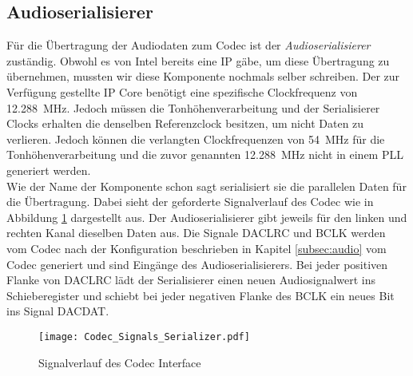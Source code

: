 \newpage
\subsection{Audioserialisierer}\label{subsec:Audio_Serializer}

Für die Übertragung der Audiodaten zum Codec ist der \textit{Audioserialisierer} zuständig. Obwohl es von Intel bereits eine IP gäbe, um diese Übertragung zu übernehmen, mussten wir diese Komponente nochmals selber schreiben. Der zur Verfügung gestellte IP Core benötigt eine spezifische Clockfrequenz von \SI{12.288}{MHz}. Jedoch müssen die Tonhöhenverarbeitung und der Serialisierer Clocks erhalten die denselben Referenzclock besitzen, um nicht Daten zu verlieren. Jedoch können die verlangten Clockfrequenzen von \SI{54}{MHz} für die Tonhöhenverarbeitung und die zuvor genannten \SI{12.288}{MHz} nicht in einem PLL generiert werden. \\
Wie der Name der Komponente schon sagt serialisiert sie die parallelen Daten für die Übertragung. Dabei sieht der geforderte Signalverlauf des Codec wie in Abbildung \ref{img:Codec_Signals} dargestellt aus. Der Audioserialisierer gibt jeweils für den linken und rechten Kanal dieselben Daten aus. Die Signale DACLRC und BCLK werden vom Codec nach der Konfiguration beschrieben in Kapitel \ref{subsec:audio} vom Codec generiert und sind Eingänge des Audioserialisierers. Bei jeder positiven Flanke von DACLRC lädt der Serialisierer einen neuen Audiosignalwert ins Schieberegister und schiebt bei jeder negativen Flanke des BCLK ein neues Bit ins Signal DACDAT.

\begin{figure}[h!]
	\centering
	\texttt{[image: Codec\_Signals\_Serializer.pdf]}
	\caption{Signalverlauf des Codec Interface} 
	\label{img:Codec_Signals}
\end{figure}  